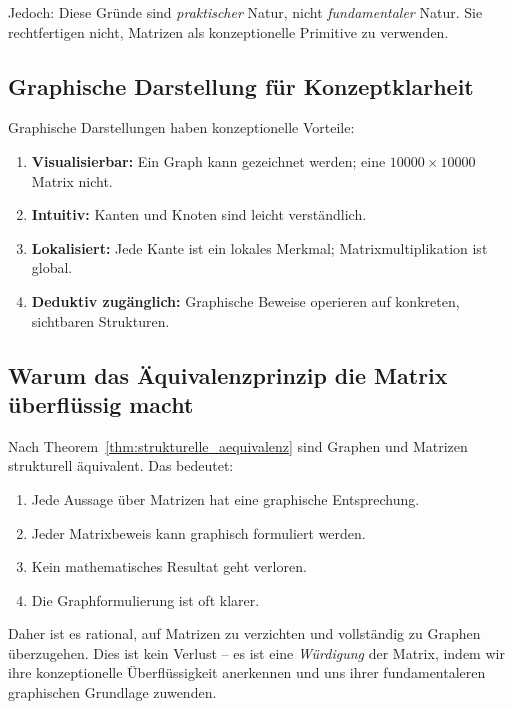 \documentclass[12pt, a4paper]{article}
\theoremstyle{definition}
\theoremstyle{remark}
\begin{document}
Jedoch: Diese Gründe sind \emph{praktischer} Natur, nicht \emph{fundamentaler} Natur. Sie rechtfertigen nicht, Matrizen als konzeptionelle Primitive zu verwenden.

\subsection{Graphische Darstellung für Konzeptklarheit}
\label{subsec:graphische_klarheit}

Graphische Darstellungen haben konzeptionelle Vorteile:

\begin{enumerate}[label=(\alph*)]
  \item \textbf{Visualisierbar:} Ein Graph kann gezeichnet werden; eine $10000 \times 10000$ Matrix nicht.
  \item \textbf{Intuitiv:} Kanten und Knoten sind leicht verständlich.
  \item \textbf{Lokalisiert:} Jede Kante ist ein lokales Merkmal; Matrixmultiplikation ist global.
  \item \textbf{Deduktiv zugänglich:} Graphische Beweise operieren auf konkreten, sichtbaren Strukturen.
\end{enumerate}

\subsection{Warum das Äquivalenzprinzip die Matrix überflüssig macht}
\label{subsec:warum_ueberflueassig}

Nach Theorem~\ref{thm:strukturelle_aequivalenz} sind Graphen und Matrizen strukturell äquivalent. Das bedeutet:

\begin{enumerate}[label=(\roman*)]
  \item Jede Aussage über Matrizen hat eine graphische Entsprechung.
  \item Jeder Matrixbeweis kann graphisch formuliert werden.
  \item Kein mathematisches Resultat geht verloren.
  \item Die Graphformulierung ist oft klarer.
\end{enumerate}

Daher ist es rational, auf Matrizen zu verzichten und vollständig zu Graphen überzugehen. Dies ist kein Verlust -- es ist eine \emph{Würdigung} der Matrix, indem wir ihre konzeptionelle Überflüssigkeit anerkennen und uns ihrer fundamentaleren graphischen Grundlage zuwenden.
\end{document}
